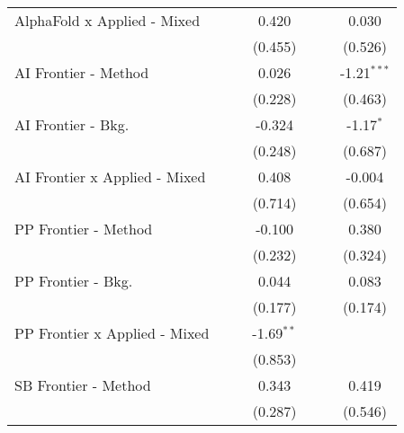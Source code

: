 \begin{tabular}{lcccccc}
   AlphaFold x Applied - Mixed   &               &               & 0.420        &               &             & 0.030\\   
                                 &               &               & (0.455)      &               &             & (0.526)\\   
   AI Frontier - Method          &               &               & 0.026        &               &             & -1.21$^{***}$\\   
                                 &               &               & (0.228)      &               &             & (0.463)\\   
   AI Frontier - Bkg.            &               &               & -0.324       &               &             & -1.17$^{*}$\\   
                                 &               &               & (0.248)      &               &             & (0.687)\\   
   AI Frontier x Applied - Mixed &               &               & 0.408        &               &             & -0.004\\   
                                 &               &               & (0.714)      &               &             & (0.654)\\   
   PP Frontier - Method          &               &               & -0.100       &               &             & 0.380\\   
                                 &               &               & (0.232)      &               &             & (0.324)\\   
   PP Frontier - Bkg.            &               &               & 0.044        &               &             & 0.083\\   
                                 &               &               & (0.177)      &               &             & (0.174)\\   
   PP Frontier x Applied - Mixed &               &               & -1.69$^{**}$ &               &             &   \\   
                                 &               &               & (0.853)      &               &             &   \\   
   SB Frontier - Method          &               &               & 0.343        &               &             & 0.419\\   
                                 &               &               & (0.287)      &               &             & (0.546)\\   

\end{tabular}
